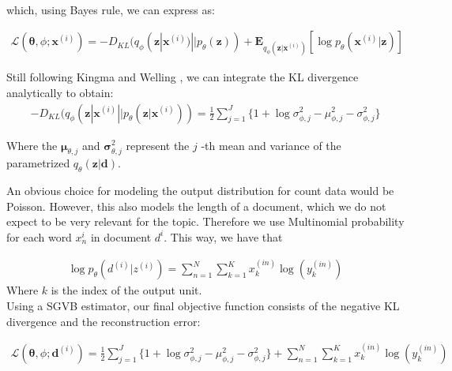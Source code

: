 \documentclass{report}
\begin{document}
\begin{align}
\end{align}

which, using Bayes rule, we can express as:

\begin{align}
\mathcal{L}(\mathbf{\theta}, \phi; \mathbf{x}^{(i)}) = -D_{KL}(q_\phi (\mathbf{z}| \mathbf{x}^{(i)})||p_\theta (\mathbf{z})) + \mathbf{E}_{q_\phi(\mathbf{z}|\mathbf{x}^{(i)})}[\log p_\theta (\mathbf{x}^{(i)}|\mathbf{z})]
\end{align}



Still following Kingma and Welling \cite{kingma2013auto}, we can integrate the KL divergence analytically to obtain: \\


\begin{align}
- D_{KL}(q_\phi (\mathbf{z}| \mathbf{x}^{(i)}||p_\theta (\mathbf{z}| \mathbf{x}^{(i)})) = \frac{1}{2}\sum\limits_{j=1}^{J}\{1+\log \sigma_{\phi ,j}^2 - \mu_{\phi,j}^2 - \sigma_{\phi ,j}^2\}
\end{align}

Where the $\mathbf{\mu}_{\theta,j}$ and $\mathbf{\sigma}_{\theta,j}^2$ represent the $j$ -th mean and variance of the parametrized $q_\theta(\mathbf{z}|\mathbf{d})$.

An obvious choice for modeling the output distribution for count data would be Poisson. However, this also models the length of a document, which we do not expect to be very relevant for the topic. Therefore we use Multinomial probability for each word $x_n^{i}$ in document $d^{i}$. This way, we have that

\begin{align}
\log p_{\theta}(d^{(i)}|z^{(i)}) = 
\sum_{n=1}^N
\sum_{k=1}^K x_k^{(in)} \log (y_k^{(in)})
\end{align}
Where $k$ is the index of the output unit.\\


Using a SGVB estimator, our final objective function consists of the negative KL divergence and the reconstruction error:

\begin{align}
\mathcal{L}(\mathbf{\theta}, \phi; \mathbf{d}^{(i)}) = \frac{1}{2}\sum\limits_{j=1}^{J}\{1+\log \sigma_{\phi ,j}^2 - \mu_{\phi,j}^2 - \sigma_{\phi ,j}^2\} 
+ \sum_{n=1}^N
\sum_{k=1}^K x_k^{(in)} \log (y_k^{(in)})
\end{align}


\end{document}
